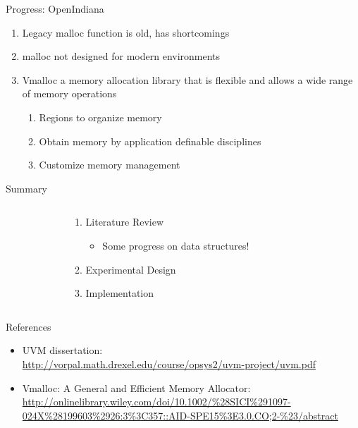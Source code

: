 \documentclass[aspectratio=169]{beamer}
\newcommand{\bi}{\begin{itemize}}
\newcommand{\ei}{\end{itemize}}
\newcommand{\bn}{\begin{enumerate}}
\newcommand{\en}{\end{enumerate}}
\begin{document}
\begin{frame}{Progress: OpenIndiana}
    \begin{enumerate}
        \item Legacy malloc function is old, has shortcomings
        \item malloc not designed for modern environments
        \item Vmalloc a memory allocation library that is flexible and allows a
            wide range of memory operations
            \begin{enumerate}
                \item Regions to organize memory
                \item Obtain memory by application definable disciplines
                \item Customize memory management
            \end{enumerate}
    \end{enumerate}
\end{frame}

\begin{frame}{Summary}
  \begin{columns}[T]
    \begin{column}{0.2\textwidth}
    \end{column}
    \begin{column}{0.6\textwidth}
      \bn
    \item Literature Review
      \bi
    \item Some progress on data structures!
      \ei
    \item Experimental Design
    \item Implementation
      \en
    \end{column}
    \begin{column}{0.2\textwidth}
    \end{column}
  \end{columns}
\end{frame}

\begin{frame}[noframenumbering]{References}
  \small
  \bi
\item UVM dissertation:\\
  \url{http://vorpal.math.drexel.edu/course/opsys2/uvm-project/uvm.pdf}
  \ei
  \bi
  \item Vmalloc: A General and Efficient Memory Allocator:
      \url{http://onlinelibrary.wiley.com/doi/10.1002/\%28SICI\%291097-024X\%28199603\%2926:3\%3C357::AID-SPE15\%3E3.0.CO;2-\%23/abstract}
\ei
\end{frame}
\end{document}
